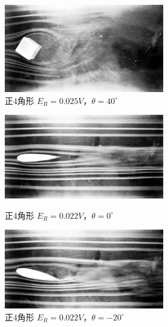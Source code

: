 \documentclass[twocolumn,10pt,a4j]{jsarticle}
\begin{document}
\begin{figure}[htbp]
\begin{minipage}{0.5\hsize}
          \begin{center}
            \includegraphics[width=7cm]{../img/kashika/007.jpg}
            \caption{正4角形 $E_{R}=0.025V， \theta=40^\circ$}
          \end{center}
        \end{minipage}
      \end{figure}

      \begin{figure}[htbp]
        \begin{minipage}{0.5\hsize}
          \begin{center}
            \includegraphics[width=7cm]{../img/kashika/008.jpg}
            \caption{正4角形 $E_{R}=0.022V， \theta=0^\circ$}
          \end{center}
        \end{minipage}
        \begin{minipage}{0.5\hsize}
          \begin{center}
            \includegraphics[width=7cm]{../img/kashika/009.jpg}
            \caption{正4角形 $E_{R}=0.022V， \theta=-20^\circ$}
          \end{center}
        \end{minipage}
        \begin{minipage}{0.5\hsize}

\end{minipage}
\end{figure}
\end{document}
